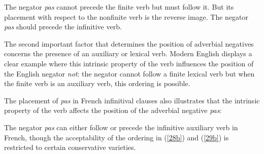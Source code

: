 \documentclass[output=paper
                ,modfonts
                		,nonflat
	        ,collection
	        ,collectionchapter
	        ,collectiontoclongg
 	        ,biblatex
                ,babelshorthands
                ,newtxmath
                ,draftmode
                ,colorlinks, citecolor=brown
]{./langsci/langscibook}
\begin{document}
{\begin{exe}
\begin{xlist}
\begin{exe}
\begin{xlist}
\eal{}
\zl

\noindent
The negator \textit{pas} cannot precede the finite verb
but must follow it. But its placement with respect to
the nonfinite verb is the reverse image. The negator \textit{pas}
should precede the infinitive verb.

The second important factor that determines the position of adverbial
negatives concerns the presence of an auxiliary or lexical  verb.
Modern English displays a clear example where this
intrinsic property of the verb influences the position of
the English negator \textit{not}: the negator cannot follow
a finite lexical  verb but when the finite verb is an auxiliary verb,
this ordering is possible.

\eal
{}
\zl

\noindent
The placement of \textit{pas} in French infinitival
clauses also illustrates that the intrinsic property of
the verb affects the position of the adverbial negative \textit{pas}:

\eal
{}
 \label{28b}
\zl

\eal
{}
 \label{29b}
\zl

\noindent
The negator \textit{pas} can either follow or precede the infinitive
auxiliary verb in French, though the acceptability of the
ordering in (\ref{28b}) and (\ref{29b}) is restricted to certain conservative
varieties.


\end{xlist}
\end{exe}
\end{xlist}
\end{exe}}
\end{document}

